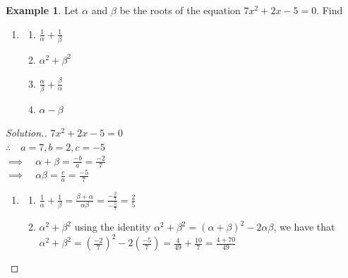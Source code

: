 \documentclass[11pt,a4paper]{article}
\theoremstyle{definition}
\newtheorem{example}[thm]{Example}
\newenvironment{solution}
  {\renewcommand{\qedsymbol}{}\begin{proof}[\textit{Solution}.]}
  {\end{proof}}
\begin{document}
\begin{example}

Let $\alpha$ and $\beta$ be the roots of the equation $7x^2+2x-5=0$. Find
\begin{enumerate}
\item[]
\begin{enumerate}
\item $\frac{1}{\alpha}+\frac{1}{\beta}$
\item $\alpha^2+\beta^2$
\item $\frac{\alpha}{\beta}+\frac{\beta}{\alpha}$
\item $\alpha -\beta$\\
\end{enumerate}
\end{enumerate}
\end{example}
\begin{solution}

$7x^2+2x-5=0$\\

$\therefore\quad  a=7, b=2, c=-5$\\

$\implies \quad  \alpha +\beta = \frac{-b}{a}=\frac{-2}{7}$\\

$\implies \quad  \alpha \beta =\frac{c}{a}=\frac{-5}{7}$\\

\begin{enumerate}
\item[]
\begin{enumerate}
\item $\frac{1}{\alpha}+\frac{1}{\beta}=\frac{\beta +\alpha}{\alpha \beta}=\frac{-\frac{2}{7}}{-\frac{5}{7}}=\frac{2}{5}$\\
\item $\alpha^2+\beta^2$ using the identity $\alpha^2+\beta^2=(\alpha+\beta)^2-2\alpha \beta$, we have that\\

$\alpha^2+\beta^2=\left(\frac{-2}{7}\right)^2-2\left(\frac{-5}{7}\right)=\frac{4}{49}+\frac{10}{7}=\frac{4+70}{49}$\\


\end{enumerate}
\end{enumerate}
\end{solution}
\end{document}
